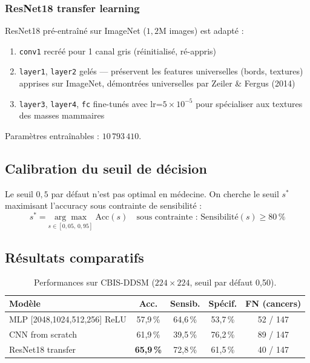 \documentclass[a4paper,11pt]{article}
\begin{document}
\subsubsection*{ResNet18 transfer learning}

ResNet18 pré-entraîné sur ImageNet ($1{,}2$M images) est adapté :
\begin{enumerate}[leftmargin=*]
  \item \texttt{conv1} recréé pour 1 canal gris (réinitialisé, ré-appris)
  \item \texttt{layer1}, \texttt{layer2} gelés — préservent les features universelles
        (bords, textures) apprises sur ImageNet, démontrées universelles par Zeiler \& Fergus (2014)
  \item \texttt{layer3}, \texttt{layer4}, \texttt{fc} fine-tunés avec lr=$5\times10^{-5}$
        pour spécialiser aux textures des masses mammaires
\end{enumerate}
Paramètres entraînables : $10\,793\,410$.

\subsection{Calibration du seuil de décision}

Le seuil $0{,}5$ par défaut n'est pas optimal en médecine.
On cherche le seuil $s^*$ maximisant l'accuracy sous contrainte de sensibilité :
\[
  s^* = \underset{s \in [0{,}05,\,0{,}95]}{\arg\max}\;\text{Acc}(s)
  \quad \text{sous contrainte : } \text{Sensibilité}(s) \geq 80\,\%
\]

\subsection{Résultats comparatifs}

\begin{table}[H]
\centering
\caption{Performances sur CBIS-DDSM ($224\times224$, seuil par défaut 0,50).}
\begin{tabular}{lcccc}
\toprule
\textbf{Modèle} & \textbf{Acc.} & \textbf{Sensib.} & \textbf{Spécif.} & \textbf{FN (cancers)} \\
\midrule
MLP [2048,1024,512,256] ReLU & 57{,}9\,\% & 64{,}6\,\% & 53{,}7\,\% & 52 / 147 \\
CNN from scratch             & 61{,}9\,\% & 39{,}5\,\% & 76{,}2\,\% & 89 / 147 \\
ResNet18 transfer            & \textbf{65{,}9\,\%} & 72{,}8\,\% & 61{,}5\,\% & 40 / 147 \\
\bottomrule
\end{tabular}
\label{tab:ddsm}
\end{table}
\end{document}
